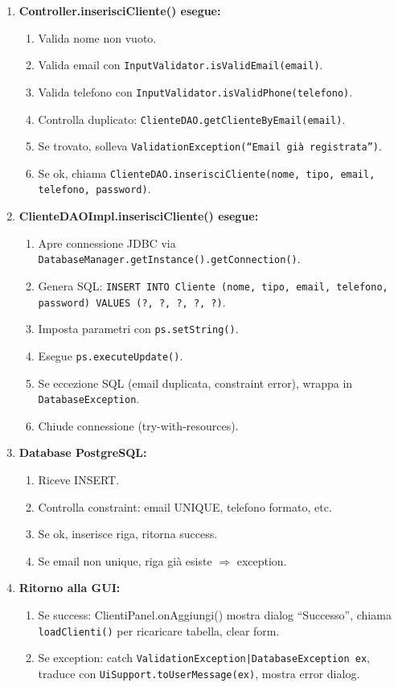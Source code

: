 \documentclass[12pt,a4paper]{article}
\begin{document}
\begin{enumerate}
\begin{enumerate}
  \item \textbf{Controller.inserisciCliente() esegue:}
  \begin{enumerate}
    \item Valida nome non vuoto.
    \item Valida email con \texttt{InputValidator.isValidEmail(email)}.
    \item Valida telefono con \texttt{InputValidator.isValidPhone(telefono)}.
    \item Controlla duplicato: \texttt{ClienteDAO.getClienteByEmail(email)}.
    \item Se trovato, solleva \texttt{ValidationException(``Email già registrata'')}.
    \item Se ok, chiama \texttt{ClienteDAO.inserisciCliente(nome, tipo, email, telefono, password)}.
  \end{enumerate}
  
  \item \textbf{ClienteDAOImpl.inserisciCliente() esegue:}
  \begin{enumerate}
    \item Apre connessione JDBC via \texttt{DatabaseManager.getInstance().getConnection()}.
    \item Genera SQL: \texttt{INSERT INTO Cliente (nome, tipo, email, telefono, password) VALUES (?, ?, ?, ?, ?)}.
    \item Imposta parametri con \texttt{ps.setString()}.
    \item Esegue \texttt{ps.executeUpdate()}.
    \item Se eccezione SQL (email duplicata, constraint error), wrappa in \texttt{DatabaseException}.
    \item Chiude connessione (try-with-resources).
  \end{enumerate}
  
  \item \textbf{Database PostgreSQL:}
  \begin{enumerate}
    \item Riceve INSERT.
    \item Controlla constraint: email UNIQUE, telefono formato, etc.
    \item Se ok, inserisce riga, ritorna success.
    \item Se email non unique, riga già esiste $\Rightarrow$ exception.
  \end{enumerate}
  
  \item \textbf{Ritorno alla GUI:}
  \begin{enumerate}
    \item Se success: ClientiPanel.onAggiungi() mostra dialog ``Successo'', chiama \texttt{loadClienti()} per ricaricare tabella, clear form.
    \item Se exception: catch \texttt{ValidationException|DatabaseException ex}, traduce con \texttt{UiSupport.toUserMessage(ex)}, mostra error dialog.
  \end{enumerate}
  

\end{enumerate}
\end{enumerate}
\end{document}
